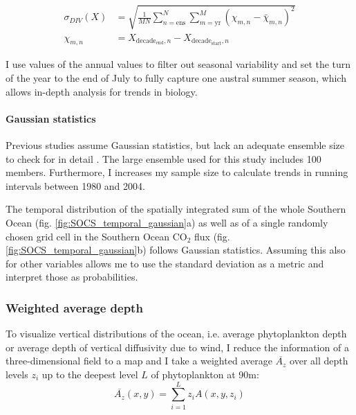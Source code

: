 \documentclass[12pt]{article}
\begin{document}
\begin{align*}
\sigma_{DIV}(X) &= \sqrt{\frac{1}{M N} \sum_{n=\text{ens}}^{N} \sum_{m=\text{yr}}^{M} \left( \chi_{m,n} -\bar{\chi}_{m,n}\right)^{2}} \\
\chi_{m,n}&=X_{\text{decade}_{\text{end}},n}-X_{\text{decade}_{\text{start}},n}
\end{align*}


I use values of the annual values to filter out seasonal variability and set the turn of the year to the end of July to fully capture one austral summer season, which allows in-depth analysis for trends in biology. 

\paragraph{Gaussian statistics}
Previous studies assume Gaussian statistics, but lack an adequate ensemble size to check for in detail \citep{Deser2012,Thompson2015}. The large ensemble used for this study includes 100 members. Furthermore, I increases my sample size to calculate trends in running intervals between 1980 and 2004. 

The temporal distribution of the spatially integrated sum of the whole Southern Ocean (fig. \ref{fig:SOCS_temporal_gaussian}a) as well as of a single randomly chosen grid cell in the Southern Ocean CO$_2$ flux (fig. \ref{fig:SOCS_temporal_gaussian}b) follows Gaussian statistics. Assuming this also for other variables allows me to use the standard deviation as a metric and interpret those as probabilities.






\subsubsection{Weighted average depth}
To visualize vertical distributions of the ocean, i.e. average phytoplankton depth or average depth of vertical diffusivity due to wind, I reduce the information of a three-dimensional field to a map and I take a weighted average $\overline{A_z}$ over all depth levels $z_i$ up to the deepest level $L$ of phytoplankton at 90m: \[ \overline{A_z}(x,y)=\sum_{i=1}^L z_i A(x,y,z_i) \]
\end{document}
